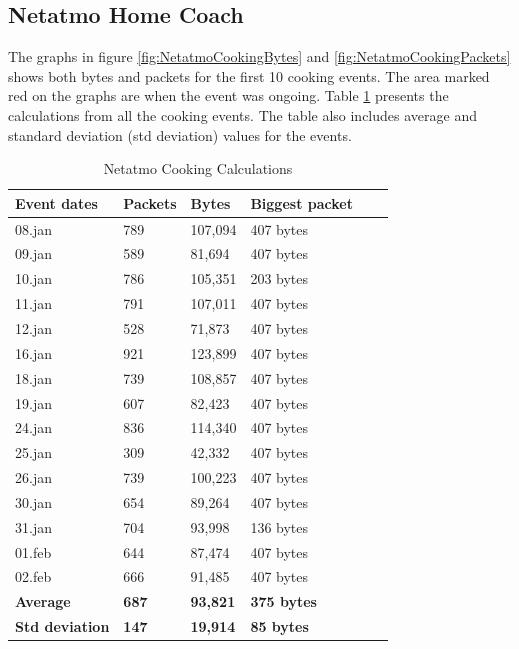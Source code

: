 \subsection{Netatmo Home Coach}
The graphs in figure \ref{fig:NetatmoCookingBytes} and \ref{fig:NetatmoCookingPackets} shows both bytes and packets for the first 10 cooking events. The area marked red on the graphs are when the event was ongoing. Table \ref{tab:NetatmoCookingCalculations} presents the calculations from all the cooking events. The table also includes average and standard deviation (std deviation) values for the events. 

\begin{table}[!ht]
    \centering
    \caption{Netatmo Cooking Calculations}
    \begin{tabular}{|l|l|l|l|l|l|}
    \hline
        \textbf{Event dates} & \textbf{Packets} & \textbf{Bytes} & \textbf{Biggest packet} \\ \hline
        08.jan & 789 & 107,094 & 407 bytes \\ \hline
        09.jan & 589 & 81,694 & 407 bytes \\ \hline
        10.jan & 786 & 105,351 & 203 bytes \\ \hline
        11.jan & 791 & 107,011 & 407 bytes \\ \hline
        12.jan & 528 & 71,873 & 407 bytes \\ \hline
        16.jan & 921 & 123,899 & 407 bytes \\ \hline
        18.jan & 739 & 108,857 & 407 bytes  \\ \hline
        19.jan & 607 & 82,423 & 407 bytes \\ \hline
        24.jan & 836 & 114,340 & 407 bytes \\ \hline
        25.jan & 309 & 42,332 & 407 bytes \\ \hline
        26.jan & 739 & 100,223 & 407 bytes \\ \hline
        30.jan & 654 & 89,264 & 407 bytes \\ \hline
        31.jan & 704 & 93,998 & 136 bytes \\ \hline
        01.feb & 644 & 87,474 & 407 bytes \\ \hline
        02.feb & 666 & 91,485 & 407 bytes \\ \hline
        \textbf{Average} &  \textbf{687}  &  \textbf{93,821}  &  \textbf{375 bytes} \\ \hline
        \textbf{Std deviation} &  \textbf{147}  & \textbf{19,914}  &  \textbf{85 bytes} \\ \hline
    \end{tabular}
    \label{tab:NetatmoCookingCalculations}
\end{table}

